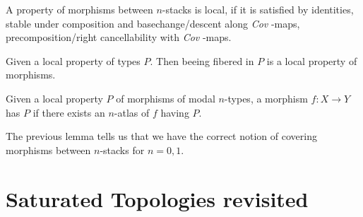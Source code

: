 \documentclass{article}
\newcommand{\Cov}{\emph{Cov} }
\begin{document}
\begin{definition}
    A property of morphisms between  $n$-stacks is local, if it is satisfied by identities, stable under composition and basechange/descent along \Cov-maps, precomposition/right cancellability with \Cov-maps.
\end{definition}
\begin{lemma}
    Given a local property of types $P$. Then beeing fibered in $P$ is a local property of morphisms.
\end{lemma}
\begin{lemma}
    Given a local property $P$ of morphisms of modal $n$-types, a morphism $f : X \to Y$ has $P$ if there exists an $n$-atlas of $f$ having $P$.
\end{lemma}
The previous lemma tells us that we have the correct notion of covering morphisms between  $n$-stacks for $n = 0,1$.


\section{Saturated Topologies revisited}
\end{document}
